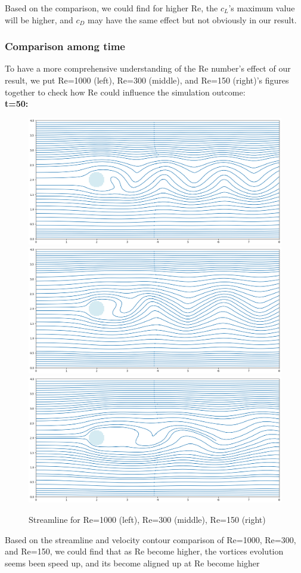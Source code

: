 \documentclass[12pt]{article}
\begin{document}
Based on the comparison, we could find for higher Re, the $c_L$'s maximum value will be higher, and $c_D$ may have the same effect but not obviously in our result.




\subsubsection{Comparison among time}

To have a more comprehensive understanding of the Re number's effect of our result, we put Re=1000 (left), Re=300 (middle), and Re=150 (right)'s figures together to check how Re could influence the simulation outcome:\\

\noindent \textbf{t=50:}

\begin{figure}[H]
    \centering
    \includegraphics[width=0.3\linewidth]{figure/N32_Re1000_8x4_t50/stline_N32_Re1000_8x4_t50.jpg}
    \includegraphics[width=0.3\linewidth]{figure/N32_Re300_8x4_t50/stline_N32_Re300_8x4_t50.jpg}
    \includegraphics[width=0.3\linewidth]{figure/N32_Re150_8x4_t50/stline_N32_Re150_8x4_t50.jpg}
    \caption{Streamline for Re=1000 (left), Re=300 (middle), Re=150 (right)}
\end{figure}

Based on the streamline and velocity contour comparison of Re=1000, Re=300, and Re=150, we could find that as Re become higher, the vortices evolution seems been speed up, and its become aligned up at Re become higher
\end{document}
